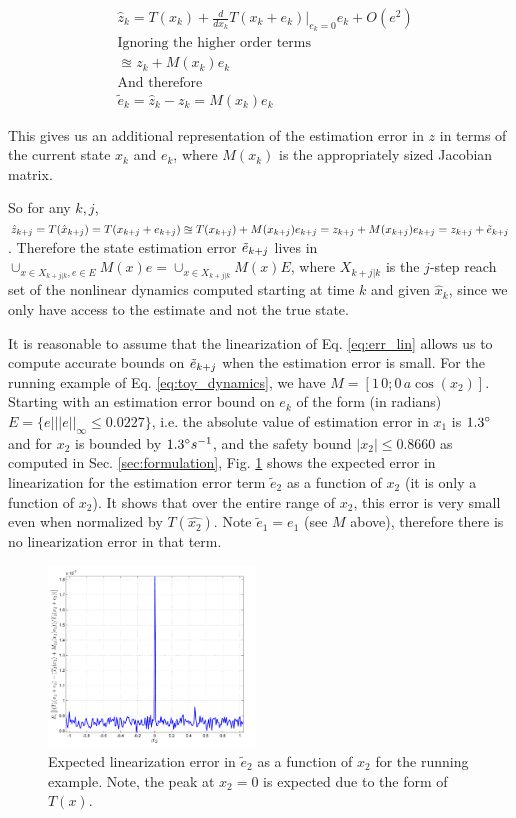 \begin{subequations}
\label{eq:err_lin}
\begin{align}
&\hat{z}_k = T(x_k) + \frac{d}{dx_k} T(x_k+e_k)|_{e_k=0}e_k + O(e^2) \\
&\text{Ignoring the higher order terms} \nonumber \\
&\approxeq z_k + M(x_k)e_k  \\
&\text{And therefore} \nonumber \\
&\tilde{e}_k = \hat{z}_k - z_k = M(x_k)e_k
\end{align}
\end{subequations}

This gives us an additional representation of the estimation error in $z$ in terms of the current state $x_k$ and $e_k$, where $M(x_k)$ is the appropriately sized Jacobian matrix. 

So for any $k,j$, $\hat{z}_{k+j} = T(\hat{x}_{k+j}) = T(x_{k+j} + e_{k+j}) \approxeq T(x_{k+j}) + M(x_{k+j})e_{k+j} = z_{k+j} + M(x_{k+j})e_{k+j} = z_{k+j} + \tilde{e}_{{k+j}}$.
Therefore the state estimation error $\tilde{e}_{k+j}$ lives in 
$\cup_{x\in X_{k+j|k}, e \in E}M(x)e = \cup_{x \in X_{k+j|k}}M(x)E$, 
where $X_{k+j|k}$ is the $j$-step reach set of the nonlinear dynamics computed starting at time $k$ and given $\hat{x}_k$, since we only have access to the estimate and not the true state.

It is reasonable to assume that the linearization of Eq. \ref{eq:err_lin} allows us to compute accurate bounds on $\tilde{e}_{k+j}$ when the estimation error is small. For the running example of Eq. \ref{eq:toy_dynamics}, we have $M = [1 \, 0;0 \,a\cos(x_2)]$. Starting with an estimation error bound on $e_k$ of the form (in radians) $E = \lbrace e| ||e||_{\infty} \leq 0.0227\rbrace$, i.e. the absolute value of estimation error in $x_1$ is $1.3\degree$ and for $x_2$ is bounded by $1.3\degree s^{-1}$, and the safety bound $|x_2|\leq 0.8660$ as computed in Sec. \ref{sec:formulation}, Fig. \ref{fig:fb_err} shows the expected error in linearization for the estimation error term $\tilde{e}_2$ as a function of $x_2$ (it is only a function of $x_2$). It shows that over the entire range of $x_2$, this error is very small even when normalized by $T(\hat{x_2})$. Note $\tilde{e}_1 = e_1$ (see $M$ above), therefore there is no linearization error in that term.


\begin{figure}
\includegraphics[width=0.49\textwidth]{figs/Toy_LinErrEst_scissored.pdf}
\caption{Expected linearization error in $\tilde{e}_2$ as a function of $x_2$ for the running example. Note, the peak at $x_2=0$ is expected due to the form of $T(x)$. }
\label{fig:fb_err}
\end{figure}
